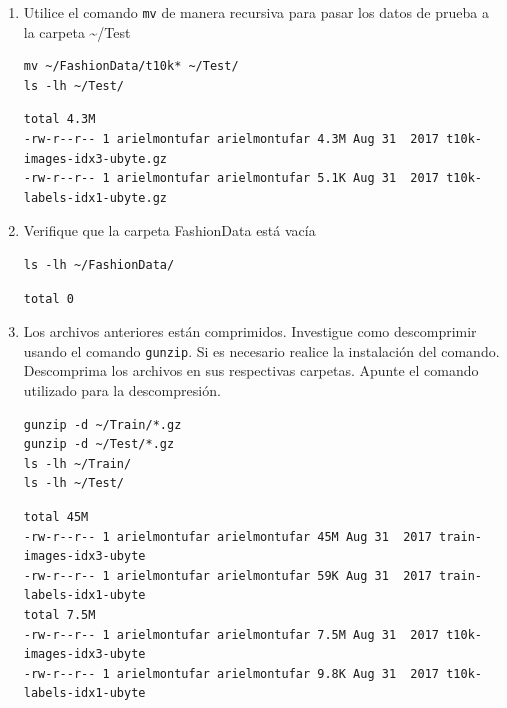 \documentclass{article}
\begin{document}
\begin{enumerate}
\begin{verbatim}
\end{verbatim}

\begin{verbatim}
total 51M
-rw-r--r-- 1 arielmontufar arielmontufar 26M Aug 31  2017 train-images-idx3-ubyte.gz
-rw-r--r-- 1 arielmontufar arielmontufar 26M Aug 31  2017 train-images-idx3-ubyte.gz.1
-rw-r--r-- 1 arielmontufar arielmontufar 29K Aug 31  2017 train-labels-idx1-ubyte.gz
\end{verbatim}

\item Utilice el comando \texttt{mv} de manera recursiva para pasar los datos de
prueba a la carpeta \textasciitilde{}/Test
\begin{verbatim}
mv ~/FashionData/t10k* ~/Test/
ls -lh ~/Test/
\end{verbatim}

\begin{verbatim}
total 4.3M
-rw-r--r-- 1 arielmontufar arielmontufar 4.3M Aug 31  2017 t10k-images-idx3-ubyte.gz
-rw-r--r-- 1 arielmontufar arielmontufar 5.1K Aug 31  2017 t10k-labels-idx1-ubyte.gz
\end{verbatim}

\item Verifique que la carpeta FashionData está vacía
\begin{verbatim}
ls -lh ~/FashionData/
\end{verbatim}

\begin{verbatim}
total 0
\end{verbatim}

\item Los archivos anteriores están comprimidos. Investigue como
descomprimir usando el comando \texttt{gunzip}. Si es necesario realice la
instalación del comando. Descomprima los archivos en sus
respectivas carpetas. Apunte el comando utilizado para la descompresión.
\begin{verbatim}
gunzip -d ~/Train/*.gz
gunzip -d ~/Test/*.gz
ls -lh ~/Train/
ls -lh ~/Test/
\end{verbatim}

\begin{verbatim}
total 45M
-rw-r--r-- 1 arielmontufar arielmontufar 45M Aug 31  2017 train-images-idx3-ubyte
-rw-r--r-- 1 arielmontufar arielmontufar 59K Aug 31  2017 train-labels-idx1-ubyte
total 7.5M
-rw-r--r-- 1 arielmontufar arielmontufar 7.5M Aug 31  2017 t10k-images-idx3-ubyte
-rw-r--r-- 1 arielmontufar arielmontufar 9.8K Aug 31  2017 t10k-labels-idx1-ubyte
\end{verbatim}


\end{enumerate}
\end{document}

